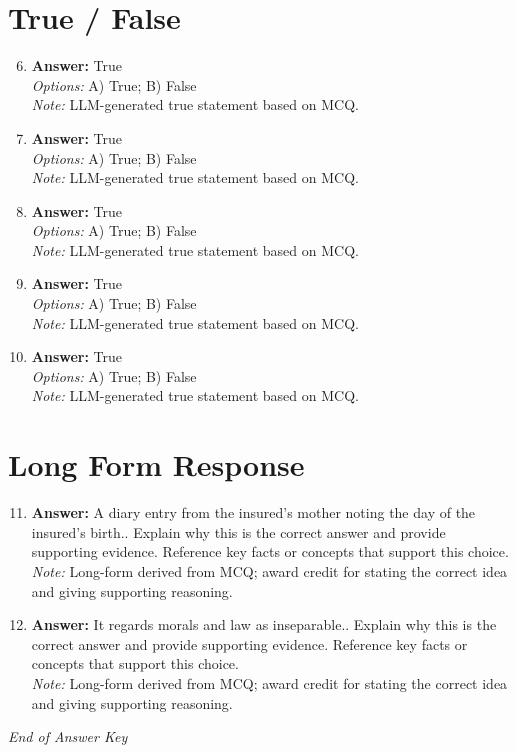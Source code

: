 \documentclass[12pt]{article}
\begin{document}
\section*{True / False}
\begin{enumerate}[label=\arabic*.]
\setcounter{enumi}{5}
\item \textbf{Answer:} True
\\ \textit{Options:} A) True; B) False
\\ \textit{Note:} LLM-generated true statement based on MCQ.
\item \textbf{Answer:} True
\\ \textit{Options:} A) True; B) False
\\ \textit{Note:} LLM-generated true statement based on MCQ.
\item \textbf{Answer:} True
\\ \textit{Options:} A) True; B) False
\\ \textit{Note:} LLM-generated true statement based on MCQ.
\item \textbf{Answer:} True
\\ \textit{Options:} A) True; B) False
\\ \textit{Note:} LLM-generated true statement based on MCQ.
\item \textbf{Answer:} True
\\ \textit{Options:} A) True; B) False
\\ \textit{Note:} LLM-generated true statement based on MCQ.
\end{enumerate}

\section*{Long Form Response}
\begin{enumerate}[label=\arabic*.]
\setcounter{enumi}{10}
\item \textbf{Answer:} A diary entry from the insured's mother noting the day of the insured's birth.. Explain why this is the correct answer and provide supporting evidence. Reference key facts or concepts that support this choice.
\\ \textit{Note:} Long-form derived from MCQ; award credit for stating the correct idea and giving supporting reasoning.
\item \textbf{Answer:} It regards morals and law as inseparable.. Explain why this is the correct answer and provide supporting evidence. Reference key facts or concepts that support this choice.
\\ \textit{Note:} Long-form derived from MCQ; award credit for stating the correct idea and giving supporting reasoning.
\end{enumerate}

\vfill
\noindent\textit{End of Answer Key}
\end{document}
